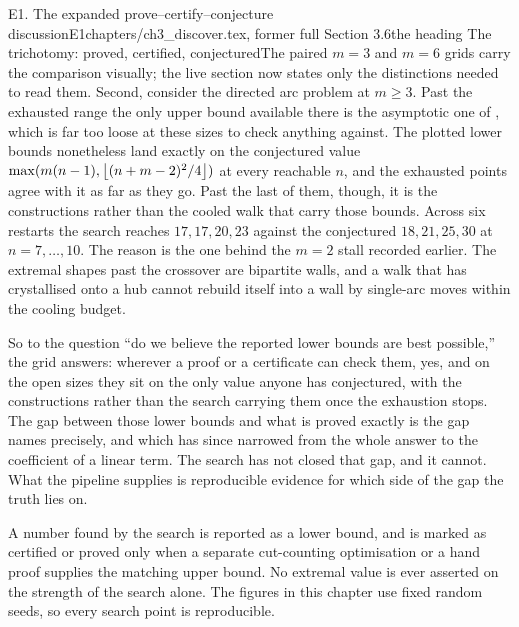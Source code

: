 \begin{offcut}{E1. The expanded prove--certify--conjecture discussion}{E1}{chapters/ch3\_discover.tex, former full Section 3.6}{the heading The trichotomy: proved, certified, conjectured}{The paired $m=3$ and $m=6$ grids carry the comparison visually; the live section now states only the distinctions needed to read them.}
Second, consider the directed arc problem at $m \ge 3$. Past the exhausted range the only upper bound available there is the asymptotic one of , which is far too loose at these sizes to check anything against. The plotted lower bounds nonetheless land exactly on the conjectured value $\max(m(n-1), \left\lfloor (n+m-2)^2/4 \right\rfloor)$ at every reachable $n$, and the exhausted points agree with it as far as they go. Past the last of them, though, it is the constructions rather than the cooled walk that carry those bounds. Across six restarts the search reaches $17, 17, 20, 23$ against the conjectured $18, 21, 25, 30$ at $n = 7, \dots, 10$. The reason is the one behind the $m = 2$ stall recorded earlier. The extremal shapes past the crossover are bipartite walls, and a walk that has crystallised onto a hub cannot rebuild itself into a wall by single-arc moves within the cooling budget.

So to the question ``do we believe the reported lower bounds are best possible,'' the grid answers: wherever a proof or a certificate can check them, yes, and on the open sizes they sit on the only value anyone has conjectured, with the constructions rather than the search carrying them once the exhaustion stops. The gap between those lower bounds and what is proved exactly is the gap  names precisely, and which has since narrowed from the whole answer to the coefficient of a linear term. The search has not closed that gap, and it cannot. What the pipeline supplies is reproducible evidence for which side of the gap the truth lies on.

\begin{computernote}[Honesty]
A number found by the search is reported as a lower bound, and is marked as certified or proved only when a separate cut-counting optimisation or a hand proof supplies the matching upper bound. No extremal value is ever asserted on the strength of the search alone. The figures in this chapter use fixed random seeds, so every search point is reproducible.
\end{computernote}
\end{offcut}

